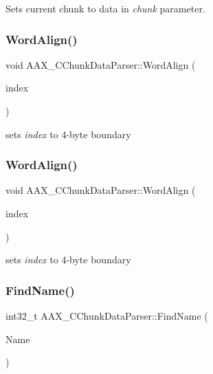 Sets current chunk to data in {\itshape chunk} parameter. 

\mbox{\label{a01461_acaf10308e9758014bff6872b4260a9e1}} 
\subsubsection{\texorpdfstring{WordAlign()}{WordAlign()}\hspace{0.1cm}{\footnotesize\ttfamily [1/2]}}
{\footnotesize\ttfamily void A\+A\+X\+\_\+\+C\+Chunk\+Data\+Parser\+::\+Word\+Align (\begin{DoxyParamCaption}\item[{uint32\+\_\+t \&}]{index }\end{DoxyParamCaption})\hspace{0.3cm}{\ttfamily [protected]}}



sets {\itshape index} to 4-\/byte boundary 

\mbox{\label{a01461_a90dc10c7cb3f1a9af70179be70a8d739}} 
\subsubsection{\texorpdfstring{WordAlign()}{WordAlign()}\hspace{0.1cm}{\footnotesize\ttfamily [2/2]}}
{\footnotesize\ttfamily void A\+A\+X\+\_\+\+C\+Chunk\+Data\+Parser\+::\+Word\+Align (\begin{DoxyParamCaption}\item[{int32\+\_\+t \&}]{index }\end{DoxyParamCaption})\hspace{0.3cm}{\ttfamily [protected]}}



sets {\itshape index} to 4-\/byte boundary 

\mbox{\label{a01461_a66556bfad37d6541cf4d317a48d099c2}} 
\subsubsection{\texorpdfstring{FindName()}{FindName()}}
{\footnotesize\ttfamily int32\+\_\+t A\+A\+X\+\_\+\+C\+Chunk\+Data\+Parser\+::\+Find\+Name (\begin{DoxyParamCaption}\item[{const \mbox{\hyperlink{a01573}{A\+A\+X\+\_\+\+C\+String}} \&}]{Name }\end{DoxyParamCaption})\hspace{0.3cm}{\ttfamily [protected]}}



